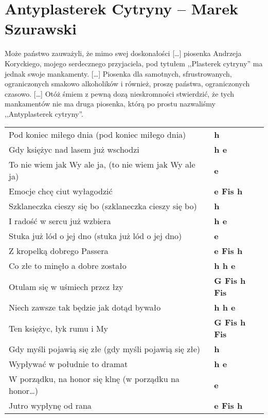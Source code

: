 {\small \section{Antyplasterek Cytryny -- Marek Szurawski}{
\begin{flushleft}
Może państwo zauważyli, że mimo swej doskonałości [\ldots] piosenka Andrzeja Koryckiego, mojego serdecznego przyjaciela, pod tytułem ,,Plasterek cytryny'' ma jednak swoje mankamenty. [\ldots] Piosenka dla samotnych, sfrustrowanych, ograniczonych smakowo alkoholików i również, proszę państwa, ograniczonych czasowo. [\ldots] Otóż śmiem z pewną dozą nieskromności stwierdzić, że tych mankamentów nie ma druga piosenka, którą po prostu nazwaliśmy ,,Antyplasterek cytryny''.
\end{flushleft}
}
\begin{tabular}{@{\hspace{-6mm}}l@{\hspace{4mm}}>{\bfseries}l}
Pod koniec miłego dnia (pod koniec miłego dnia) & h \\
Gdy księżyc nad lasem już wschodzi & h e \\
To nie wiem jak Wy ale ja, (to nie wiem jak Wy ale ja) & e \\
Emocje chcę ciut wyłagodzić & e Fis h \\[1.5mm]

Szklaneczka cieszy się bo (szklaneczka cieszy się bo) & h \\
I radość w sercu już wzbiera & h e \\
Stuka już lód o jej dno (stuka już lód o jej dno) & e \\
Z kropelką dobrego Passera & e Fis h \\[1.5mm]

 Co złe to minęło a dobre zostało & h h e \\
 Otulam się w uśmiech przez łzy & G Fis h Fis \\
 Niech zawsze tak będzie jak dotąd bywało & h h e \\
 Ten księżyc, łyk rumu i My & G Fis h Fis \\[1.5mm]

Gdy myśli pojawią się złe (gdy myśli pojawią się złe) & h \\
Wypływać w południe to dramat & h e \\
W porządku, na honor się klnę (w porządku na honor\ldots) & e \\
Jutro wypłynę od rana & e Fis h \\[1.5mm]


\end{tabular}}
